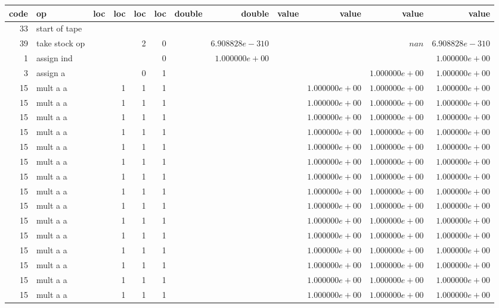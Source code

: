 \documentclass{article}
\begin{document}
\tiny
\begin{tabular}{|r|l|r|r|r|r||r|r||r|r|r|r|} \hline 
 code & op & loc & loc & loc & loc & double & double & value & value & value & value \\ \hline 
 33 & start of tape & & & & & & & & & &  \\ \hline 
39 & take stock op & & & 2 & 0 & &$ 6.908828e-310 $& & &$ nan $&$ 6.908828e-310 $\\ \hline 
1 & assign ind & & & & 0 & &$ 1.000000e+00 $& & & &$ 1.000000e+00 $\\ \hline 
3 & assign a & & & 0 & 1 & & & & &$ 1.000000e+00 $&$ 1.000000e+00 $\\ \hline 
15 & mult a a & & 1 & 1 & 1 & & & &$ 1.000000e+00 $&$ 1.000000e+00 $&$ 1.000000e+00 $\\ \hline 
15 & mult a a & & 1 & 1 & 1 & & & &$ 1.000000e+00 $&$ 1.000000e+00 $&$ 1.000000e+00 $\\ \hline 
15 & mult a a & & 1 & 1 & 1 & & & &$ 1.000000e+00 $&$ 1.000000e+00 $&$ 1.000000e+00 $\\ \hline 
15 & mult a a & & 1 & 1 & 1 & & & &$ 1.000000e+00 $&$ 1.000000e+00 $&$ 1.000000e+00 $\\ \hline 
15 & mult a a & & 1 & 1 & 1 & & & &$ 1.000000e+00 $&$ 1.000000e+00 $&$ 1.000000e+00 $\\ \hline 
15 & mult a a & & 1 & 1 & 1 & & & &$ 1.000000e+00 $&$ 1.000000e+00 $&$ 1.000000e+00 $\\ \hline 
15 & mult a a & & 1 & 1 & 1 & & & &$ 1.000000e+00 $&$ 1.000000e+00 $&$ 1.000000e+00 $\\ \hline 
15 & mult a a & & 1 & 1 & 1 & & & &$ 1.000000e+00 $&$ 1.000000e+00 $&$ 1.000000e+00 $\\ \hline 
15 & mult a a & & 1 & 1 & 1 & & & &$ 1.000000e+00 $&$ 1.000000e+00 $&$ 1.000000e+00 $\\ \hline 
15 & mult a a & & 1 & 1 & 1 & & & &$ 1.000000e+00 $&$ 1.000000e+00 $&$ 1.000000e+00 $\\ \hline 
15 & mult a a & & 1 & 1 & 1 & & & &$ 1.000000e+00 $&$ 1.000000e+00 $&$ 1.000000e+00 $\\ \hline 
15 & mult a a & & 1 & 1 & 1 & & & &$ 1.000000e+00 $&$ 1.000000e+00 $&$ 1.000000e+00 $\\ \hline 
15 & mult a a & & 1 & 1 & 1 & & & &$ 1.000000e+00 $&$ 1.000000e+00 $&$ 1.000000e+00 $\\ \hline 
15 & mult a a & & 1 & 1 & 1 & & & &$ 1.000000e+00 $&$ 1.000000e+00 $&$ 1.000000e+00 $\\ \hline 
15 & mult a a & & 1 & 1 & 1 & & & &$ 1.000000e+00 $&$ 1.000000e+00 $&$ 1.000000e+00 $\\ \hline 

\end{tabular}
\end{document}
